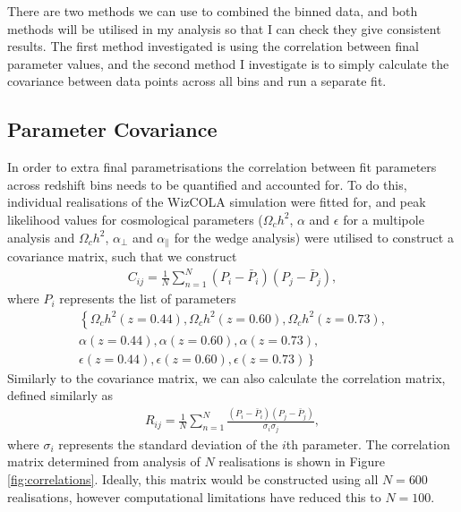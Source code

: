 \documentclass[titlesmallcaps, examinerscopy, copyrightpage]{uqthesis}
\begin{document}
There are two methods we can use to combined the binned data, and both methods will be utilised in my analysis so that I can check they give consistent results. The first method investigated is using the correlation between final parameter values, and the second method I investigate is to simply calculate the covariance between data points across all bins and run a separate fit.

\subsection{Parameter Covariance}

In order to extra final parametrisations the correlation between fit parameters across redshift bins needs to be quantified and accounted for. To do this, individual realisations of the WizCOLA simulation were fitted for, and peak likelihood values for cosmological parameters ($\Omega_c h^2$, $\alpha$ and $\epsilon$ for a multipole analysis and $\Omega_c h^2$, $\alpha_\perp$ and $\alpha_\parallel$ for the wedge analysis) were utilised to construct a covariance matrix, such that we construct
\begin{align}
C_{ij} = \frac{1}{N} \sum\limits_{n=1}^{N} (P_i - \bar{P}_i)(P_j - \bar{P}_j),
\end{align}
where $P_i$ represents the list of parameters 
\begin{align*}
\left\lbrace \Omega_c h^2 (z = 0.44), \Omega_c h^2 (z = 0.60),  \Omega_c h^2 (z = 0.73), \right. \\ 
\alpha (z = 0.44), \alpha (z = 0.60),  \alpha (z = 0.73), \\
\epsilon (z = 0.44), \left. \epsilon (z = 0.60),  \epsilon (z = 0.73) \right\rbrace
\end{align*}
Similarly to the covariance matrix, we can also calculate the correlation matrix, defined similarly as
\begin{align}
R_{ij} = \frac{1}{N} \sum\limits_{n=1}^{N} \frac{(P_i - \bar{P}_i)(P_j - \bar{P}_j)}{\sigma_i \sigma_j},
\end{align}
where $\sigma_i$ represents the standard deviation of the $i$th parameter. The correlation matrix determined from analysis of $N$ realisations is shown in Figure \ref{fig:correlations}. Ideally, this matrix would be constructed using all $N=600$ realisations, however computational limitations have reduced this to $N=100$. 
\end{document}
